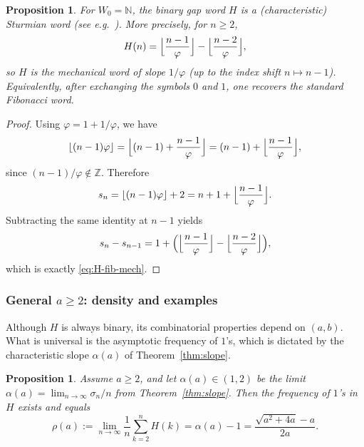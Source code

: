 \documentclass[11pt]{article}
\numberwithin{equation}{section}
\theoremstyle{plain}
\newtheorem{proposition}[theorem]{Proposition}
\theoremstyle{definition}
\theoremstyle{remark}
\newcommand{\N}{\mathbb{N}}
\newcommand{\Z}{\mathbb{Z}}
\begin{document}
\begin{proposition}\label{prop:fib-word}
For $W_0=\N$, the binary gap word $H$ is a (characteristic) Sturmian word (see e.g.~\cite{Lothaire2002}).
More precisely, for $n\ge2$,
\begin{equation}\label{eq:H-fib-mech}
  H(n)=\Bigl\lfloor \frac{n-1}{\varphi}\Bigr\rfloor
      -\Bigl\lfloor \frac{n-2}{\varphi}\Bigr\rfloor,
\end{equation}
so $H$ is the mechanical word of slope $1/\varphi$ (up to the index shift
$n\mapsto n-1$). Equivalently, after exchanging the symbols $0$ and $1$,
one recovers the standard Fibonacci word.
\end{proposition}

\begin{proof}
Using $\varphi=1+1/\varphi$, we have
\[
  \lfloor (n-1)\varphi\rfloor
  =\Bigl\lfloor (n-1)+\frac{n-1}{\varphi}\Bigr\rfloor
  =(n-1)+\Bigl\lfloor \frac{n-1}{\varphi}\Bigr\rfloor,
\]
since $(n-1)/\varphi\notin\Z$. Therefore
\[
  s_n = \lfloor (n-1)\varphi\rfloor+2
      = n+1 + \Bigl\lfloor \frac{n-1}{\varphi}\Bigr\rfloor.
\]
Subtracting the same identity at $n-1$ yields
\[
  s_n-s_{n-1}
  = 1 + \Bigl(\Bigl\lfloor \frac{n-1}{\varphi}\Bigr\rfloor
               -\Bigl\lfloor \frac{n-2}{\varphi}\Bigr\rfloor\Bigr),
\]
which is exactly \eqref{eq:H-fib-mech}.
\end{proof}



\subsubsection{General \texorpdfstring{$a\ge2$}{a>=2}: density and examples}

Although $H$ is always binary, its combinatorial properties depend on
$(a,b)$. What is universal is the asymptotic frequency of $1$'s, which is
dictated by the characteristic slope $\alpha(a)$ of Theorem~\ref{thm:slope}.

\begin{proposition}\label{thm:density-H}
Assume $a\ge2$, and let $\alpha(a)\in(1,2)$ be the limit
$\alpha(a)=\lim_{n\to\infty}\sigma_n/n$ from Theorem~\ref{thm:slope}.
Then the frequency of $1$'s in $H$ exists and equals
\begin{equation}\label{eq:rho-a}
  \rho(a):=\lim_{n\to\infty}\frac1{n}\sum_{k=2}^{n}H(k)=\alpha(a)-1
  =\frac{\sqrt{a^2+4a}-a}{2a}.
\end{equation}
\end{proposition}
\end{document}

